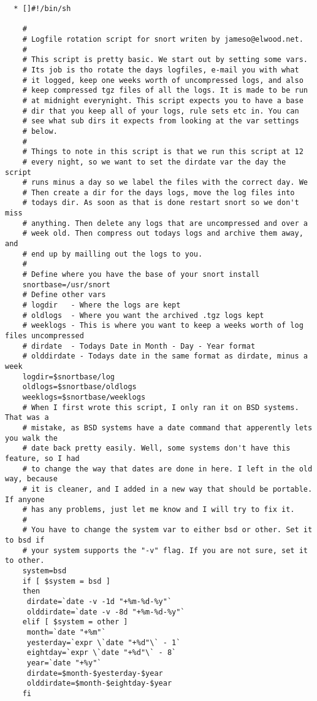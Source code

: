 \documentclass{article}
\begin{document}
\begin{verbatim}
  * []#!/bin/sh

    # 
    # Logfile rotation script for snort writen by jameso@elwood.net.
    # 
    # This script is pretty basic. We start out by setting some vars.
    # Its job is tho rotate the days logfiles, e-mail you with what 
    # it logged, keep one weeks worth of uncompressed logs, and also
    # keep compressed tgz files of all the logs. It is made to be run
    # at midnight everynight. This script expects you to have a base
    # dir that you keep all of your logs, rule sets etc in. You can 
    # see what sub dirs it expects from looking at the var settings
    # below.
    # 
    # Things to note in this script is that we run this script at 12 
    # every night, so we want to set the dirdate var the day the script
    # runs minus a day so we label the files with the correct day. We
    # Then create a dir for the days logs, move the log files into 
    # todays dir. As soon as that is done restart snort so we don't miss
    # anything. Then delete any logs that are uncompressed and over a
    # week old. Then compress out todays logs and archive them away, and
    # end up by mailling out the logs to you.
    #
    # Define where you have the base of your snort install
    snortbase=/usr/snort
    # Define other vars
    # logdir   - Where the logs are kept
    # oldlogs  - Where you want the archived .tgz logs kept
    # weeklogs - This is where you want to keep a weeks worth of log files uncompressed
    # dirdate  - Todays Date in Month - Day - Year format
    # olddirdate - Todays date in the same format as dirdate, minus a week
    logdir=$snortbase/log
    oldlogs=$snortbase/oldlogs
    weeklogs=$snortbase/weeklogs
    # When I first wrote this script, I only ran it on BSD systems. That was a
    # mistake, as BSD systems have a date command that apperently lets you walk the
    # date back pretty easily. Well, some systems don't have this feature, so I had
    # to change the way that dates are done in here. I left in the old way, because
    # it is cleaner, and I added in a new way that should be portable. If anyone
    # has any problems, just let me know and I will try to fix it.
    #
    # You have to change the system var to either bsd or other. Set it to bsd if
    # your system supports the "-v" flag. If you are not sure, set it to other.
    system=bsd
    if [ $system = bsd ]
    then
     dirdate=`date -v -1d "+%m-%d-%y"`
     olddirdate=`date -v -8d "+%m-%d-%y"`
    elif [ $system = other ]
     month=`date "+%m"`
     yesterday=`expr \`date "+%d"\` - 1`
     eightday=`expr \`date "+%d"\` - 8`
     year=`date "+%y"`
     dirdate=$month-$yesterday-$year
     olddirdate=$month-$eightday-$year
    fi
    

\end{verbatim}
\end{document}
